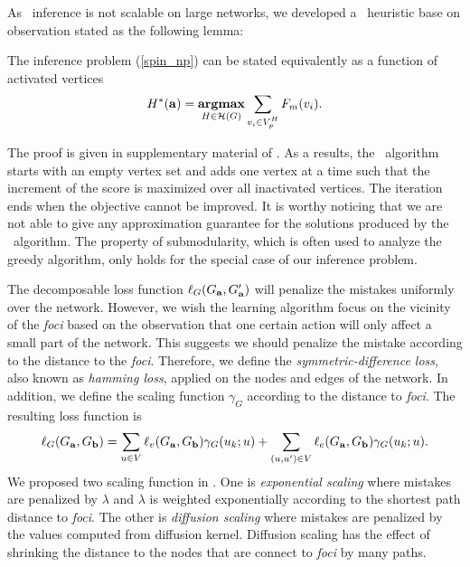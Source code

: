 {As \sdp\ inference is not scalable on large networks, we developed a \greedy\ heuristic base on observation stated as the following lemma:
\begin{lemma}
	The inference problem (\ref{spin_np}) can be stated equivalently as a function of activated vertices
	\begin{align*}
		H^{*}(\mathbf {a}) = \underset{{H \in {\cal H}(G)}}{\textbf{argmax}} \sum_{ \substack{v_i\in V^H_{\sc p}}}F_m(v_i). \nonumber 
	\end{align*}
\end{lemma}
The proof is given in supplementary material of . 
As a results, the \greedy\ algorithm starts with an empty vertex set and adds one vertex at a time such that the increment of the score is maximized over all inactivated vertices.
The iteration ends when the objective cannot be improved.  
It is worthy noticing that we are not able to give any approximation guarantee for the solutions produced by the \greedy\ algorithm.
The property of submodularity, which is often used to analyze the greedy algorithm, only holds for the special case of our inference problem.

The decomposable loss function $\ell_G(G_{\mathbf {a}},G_{\mathbf {a}}')$ will penalize the mistakes uniformly over the network.
However, we wish the learning algorithm focus on the vicinity of the \textit{foci} based on the observation that one certain action will only affect a small part of the network.
This suggests we should penalize the mistake according to the distance to the \textit{foci}.
Therefore, we define the \textit{symmetric-difference loss}, also known as \textit{hamming loss}, applied on the nodes and edges of the network. 
In addition, we define the scaling function $\gamma_G$ according to the distance to \textit{foci}.
The resulting loss function is 
\begin{align*}
	\ell_G(G_{\mathbf {a}},G_{\mathbf {b}}) = \sum_{u\in V}\ell_v(G_{\mathbf {a}},G_{\mathbf {b}})\gamma_G(u_k;u) + \sum_{(u,u')\in V}\ell_e(G_{\mathbf {a}},G_{\mathbf {b}})\gamma_G(u_k;u).
\end{align*}
We proposed two scaling function in .
One is \textit{exponential scaling} where mistakes are penalized by $\lambda$ and $\lambda$ is weighted exponentially according to the shortest path distance to \textit{foci}.
The other is \textit{diffusion scaling} where mistakes are penalized by the values computed from diffusion kernel.
Diffusion scaling has the effect of shrinking the distance to the nodes that are connect to \textit{foci} by many paths.



}
